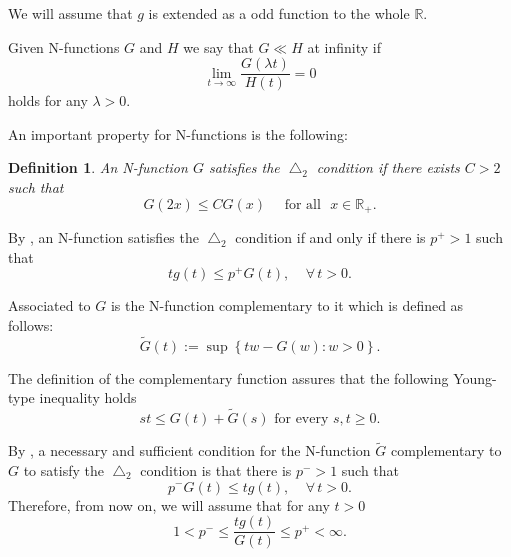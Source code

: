 \documentclass[leqno,twoside, 12pt]{amsart}
\theoremstyle{plain}
\numberwithin{equation}{section} \numberwithin{figure}{section}
\newtheorem{definition}[theorem]{Definition}
\theoremstyle{definition}
\numberwithin{equation}{section}
\begin{document}
\noindent We will assume that $g$ is extended as a odd function to the whole $\mathbb{R}$.
		
Given N-functions $G$ and $H$ we say that $G\ll H$ at infinity if
$$
\lim_{t\to\infty} \frac{G(\lambda t)}{H(t)}=0
$$
holds for any $\lambda>0$.
		
An important property for N-functions is the following:
\begin{definition}

An N-function  $G$ satisfies the $\bigtriangleup_{2}$ condition if  there exists $C > 2$ such that
\begin{equation*}
G(2x) \leq C G(x) \,\,\text{~~~for all~~} x \in \mathbb{R}_+.
\end{equation*}
\end{definition}

\noindent By \cite[Theorem 4.1, Chapter 1]{KR},  an N-function  satisfies the $\bigtriangleup_{2}$ condition if and only if there is $p^+ > 1$ such that
\begin{equation*}\label{eq p mas}
tg(t) \leq p^{+} G(t), ~~~~~\forall\, t>0.
\end{equation*}


	
\noindent  Associated to $G$ is  the N-function  complementary to it which is defined as follows:
\begin{equation}\label{Gcomp}
\widetilde{G} (t) := \sup \left\lbrace tw-G(w) \colon w>0 \right\rbrace .
\end{equation}


The definition of the complementary function assures that the following Young-type inequality holds
\begin{equation}\label{2.5}
st \leq G(t)+\widetilde{G} (s) \text{  for every } s,t \geq 0.
\end{equation}


	
By \cite[Theorem 4.3,   Chapter 1]{KR}, a necessary and sufficient condition for the N-function $\widetilde{G} $ complementary to $G$ to satisfy the $\bigtriangleup_{2}$ condition is that there is $p^{-} > 1$ such that
\begin{equation*}
p^{-} G(t)\leq 	tg(t), ~~~~~\forall\, t>0.
\end{equation*}
Therefore, from now on, we will assume that for any $t>0$
\begin{equation}\label{assumpt G}
1<p^-\le \frac{tg(t)}{G(t)} \leq p^+<\infty.
\end{equation}
\end{document}
